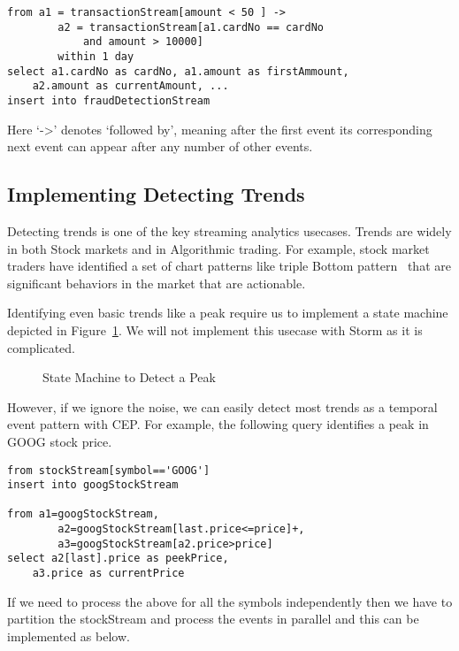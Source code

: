 \documentclass{sig-alternate}
\begin{document}
{\begin{lstlisting}[mathescape, showstringspaces=false]
from a1 = transactionStream[amount < 50 ] -> 
        a2 = transactionStream[a1.cardNo == cardNo 
        	and amount > 10000]
        within 1 day
select a1.cardNo as cardNo, a1.amount as firstAmmount, 
	a2.amount as currentAmount, ...
insert into fraudDetectionStream
\end{lstlisting} 

Here `->' denotes `followed by', meaning after the first event its corresponding next event can appear after any number of other events. 


\subsection{Implementing Detecting Trends}

Detecting trends is one of the key streaming analytics usecases. Trends are widely in both Stock markets and in Algorithmic trading. For example, stock market traders have identified a set of chart patterns like triple Bottom pattern~\cite{bulkowski2011encyclopedia} that are significant behaviors in the market that are actionable. 

Identifying even basic trends like a peak require us to implement a state machine depicted in Figure~\ref{fig:q4}. We will not implement this usecase with Storm as it is complicated. 

\begin{figure}[!htbp]
\centering
{}
\caption{State Machine to Detect a Peak}
\label{fig:q4}
\end{figure}

However, if we ignore the noise, we can easily detect most trends as a temporal event pattern with CEP. For example, the following query identifies a peak in GOOG stock price. 


\begin{lstlisting}[mathescape, showstringspaces=false]
from stockStream[symbol=='GOOG'] 
insert into googStockStream

from a1=googStockStream, 
        a2=googStockStream[last.price<=price]+,
        a3=googStockStream[a2.price>price]
select a2[last].price as peekPrice, 
	a3.price as currentPrice
\end{lstlisting} 

If we need to process the above for all the symbols independently then we have to partition the stockStream and process the events in parallel and this can be implemented as below.

}
\end{document}
